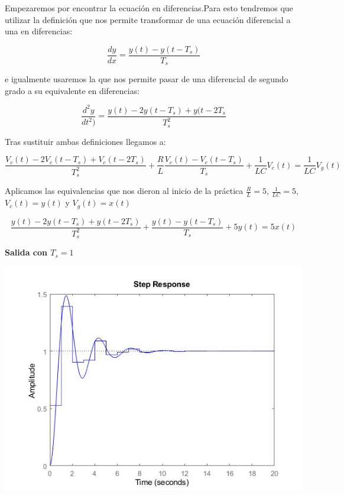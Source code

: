Empezaremos por encontrar la ecuación en diferencias.Para esto tendremos que utilizar la definición que nos permite transformar de una ecuación diferencial a una en diferencias:

\begin{equation}
\frac{dy}{dx}=\frac{y(t)-y(t-T_s)}{T_s}
\end{equation}

\noindent e igualmente usaremos la que nos permite pasar de una diferencial de segundo grado a su equivalente en diferencias:

\begin{equation}
\frac{d^2y}{dt^2)}=\frac{y(t)-2y(t-T_s)+y(t-2T_s}{T_s^2}
\end{equation}

\noindent Tras sustituir ambas definiciones llegamos a:

\begin{equation}
\frac{V_c(t)-2V_c(t-T_s)+V_c(t-2T_s)}{T_s^2}+\frac{R}{L}\frac{V_c(t)-V_c(t-T_s)}{T_s}+\frac{1}{LC}V_c(t)=\frac{1}{LC}V_g(t)
\end{equation}

\noindent Aplicamos las equivalencias que nos dieron al inicio de la práctica $\frac{R}{L}=5$, $\frac{1}{LC}=5$, $V_c(t)=y(t)$ y $V_g(t)=x(t)$

\begin{equation}
\frac{y(t)-2y(t-T_s)+y(t-2T_s)}{T_s^2}+\frac{y(t)-y(t-T_s)}{T_s}+5y(t)=5x(t)
\end{equation}

\noindent \textbf{Salida con $T_s=1$}

\noindent \includegraphics[scale=0.6]{./img2/SalidaTs1}


